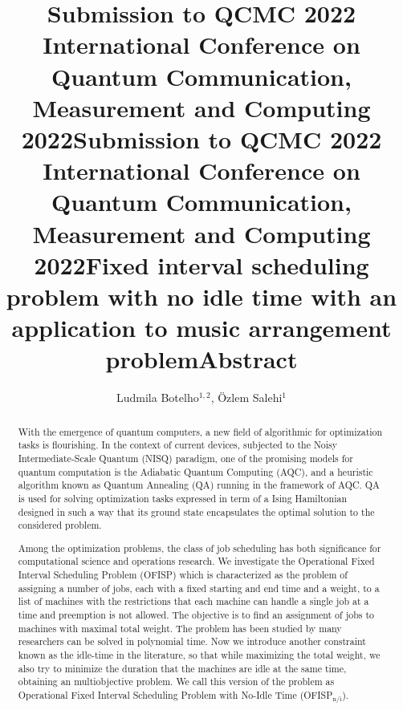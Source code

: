 \documentclass[aps,reprint]{revtex4-2}
\title@column %
\title{\normalsize Submission to QCMC 2022 \\ %
            International Conference on Quantum Communication,\\ 
            Measurement and Computing 2022}
\makeatletter
\newcommand{\printentry}{%
    \@author@finish%
    \title@column %
    \titleblock@produce %
    \suppressfloats[t] %
    \let\@AAC@list\@empty %
    \let\@AFF@list\@empty %
    \let\@AFG@list\@empty %
    \let\@address\@empty %
    \titlepage@sw %
    {\vfil\clearpage}%
}
\newcommand{\printheader}{%
    \title{\normalsize Submission to QCMC 2022 \\ %
            International Conference on Quantum Communication,\\ 
            Measurement and Computing 2022}
    \printentry
}
\makeatother
\begin{document}
\printheader



\title{Fixed interval scheduling problem with no idle time with an application to music arrangement problem} %
\author{Ludmila Botelho$^{1,2}$, \"Ozlem Salehi$^{1}$} %
{} %

\printentry
\title{\small Abstract}
\begin{abstract}
  
With the emergence of quantum computers, a new field of algorithmic for optimization tasks is flourishing. In the context of current devices, subjected to the Noisy Intermediate-Scale Quantum (NISQ) paradigm, one of the promising models for quantum computation is the Adiabatic Quantum Computing (AQC), and a heuristic algorithm known as Quantum Annealing (QA) running in the framework of AQC. QA is used for solving optimization tasks expressed in term of a Ising Hamiltonian designed in such a way that its ground state encapsulates the optimal solution to the considered problem. 

Among the optimization problems, the class of job scheduling has both significance for computational science and operations research. We investigate the Operational Fixed Interval Scheduling Problem (OFISP) which is characterized as the problem of assigning a number of jobs, each with a fixed starting and end time and a weight, to a list of machines with the restrictions that each machine can handle a single job at a time and preemption is not allowed. The objective is to find an assignment of jobs to machines with maximal total weight. The problem has been studied by many researchers can be solved in polynomial time. Now we introduce another constraint known as the idle-time in the literature, so that while maximizing the total weight, we also try to minimize the duration that the machines are idle at the same time, obtaining an multiobjective problem. We call this version of the problem as Operational Fixed Interval Scheduling Problem with No-Idle Time (OFISP$_\text{n/i}$).   


\end{abstract}
\end{document}
